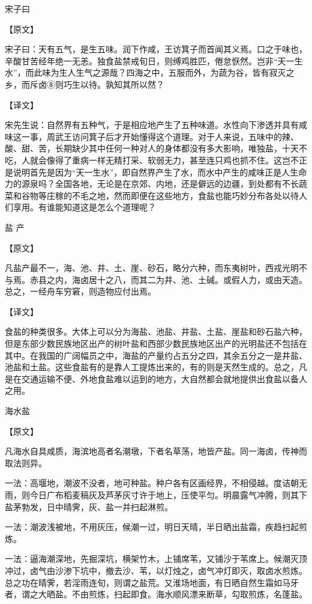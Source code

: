 \documentclass[12pt,UTF8]{ctexbook}
\begin{document}
宋子曰

【原文】

宋子曰：天有五气，是生五味。润下作咸，王访箕子而首闻其义焉。口之于味也，辛酸甘苦经年绝一无恙。独食盐禁戒旬日，则缚鸡胜匹，倦怠恹然。岂非“天一生水”，而此味为生人生气之源哉？四海之中，五服而外，为蔬为谷，皆有寂灭之乡，而斥卤⑧则巧生以待。孰知其所以然？

【译文】

宋先生说：自然界有五种气，于是相应地产生了五种味道。水性向下渗透并具有咸味这一事，周武王访问箕子后才开始懂得这个道理。对于人来说，五味中的辣、酸、甜、苦，长期缺少其中任何一种对人的身体都没有多大影响，唯独盐，十天不吃，人就会像得了重病一样无精打采、软弱无力，甚至连只鸡也抓不住。这岂不正是说明首先是因为“天一生水”，即自然界产生了水，而水中产生的咸味正是人生命力的源泉吗？全国各地，无论是在京郊、内地，还是僻远的边疆，到处都有不长蔬菜和谷物等庄稼的不毛之地，然而即便在这些地方，食盐也能巧妙分布各处以待人们享用。有谁能知道这是怎么个道理呢？

盐 产

【原文】

凡盐产最不一，海、池、井、土、崖、砂石，略分六种，而东夷树叶，西戎光明不与焉。赤县之内，海卤居十之八，而其二为井、池、土碱。或假人力，或由天造。总之，一经舟车穷窘，则造物应付出焉。

【译文】

食盐的种类很多。大体上可以分为海盐、池盐、井盐、土盐、崖盐和砂石盐六种，但是东部少数民族地区出产的树叶盐和西部少数民族地区出产的光明盐还不包括在其中。在我国的广阔幅员之中，海盐的产量约占五分之四，其余五分之一是井盐、池盐和土盐。这些食盐有的是靠人工提炼出来的，有的则是天然生成的。总之，凡是在交通运输不便、外地食盐难以运到的地方，大自然都会就地提供出食盐以备人之用。

海水盐

【原文】

凡海水自具咸质，海滨地高者名潮墩，下者名草荡，地皆产盐。同一海卤，传神而取法则异。

一法：高堰地，潮波不没者，地可种盐。种户各有区画经界，不相侵越。度诘朝无雨，则今日广布稻麦稿灰及芦茅灰寸许于地上，压使平匀。明晨露气冲腾，则其下盐茅勃发，日中晴霁，灰、盐一并扫起淋煎。

一法：潮波浅被地，不用灰压，候潮一过，明日天晴，半日晒出盐霜，疾趋扫起煎炼。

一法：逼海潮深地，先掘深坑，横架竹木，上铺席苇，又铺沙于苇席上。候潮灭顶冲过，卤气由沙渗下坑中，撤去沙、苇，以灯烛之，卤气冲灯即灭，取卤水煎炼。总之功在晴霁，若淫雨连旬，则谓之盐荒。又淮场地面，有日晒自然生霜如马牙者，谓之大晒盐。不由煎炼，扫起即食。海水顺风漂来断草，勾取煎炼，名蓬盐。
\end{document}

